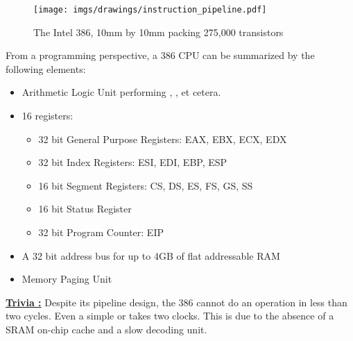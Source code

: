 \documentclass[book.tex]{subfiles}
\begin{document}
\begin{figure}[H]
\centering
\texttt{[image: imgs/drawings/instruction\_pipeline.pdf]}\\
\end{figure}
\par
\begin{figure}[H]
\centering

\caption{The Intel 386, 10mm by 10mm packing 275,000 transistors}
\end{figure}
\par
From a programming perspective, a 386 CPU can be summarized by the following elements:
\begin{itemize}
\item Arithmetic Logic Unit performing , ,  et cetera.
\item 16 registers:
\begin{itemize}
  \item 32 bit General Purpose Registers: EAX, EBX, ECX, EDX
  \item 32 bit Index Registers: ESI, EDI, EBP, ESP
  \item 16 bit Segment Registers: CS, DS, ES, FS, GS, SS
  \item 16 bit Status Register
  \item 32 bit Program Counter: EIP
\end{itemize}
\item A 32 bit address bus for up to 4GB of flat addressable RAM
\item Memory Paging Unit
\end{itemize}
 \par
 \textbf{\underline{Trivia :}} Despite its pipeline design, the 386 cannot do an operation in less than two cycles. Even a simple  or  takes two clocks. This is due to the absence of a SRAM on-chip cache and a slow decoding unit.\\
 \par
 
\end{document}
